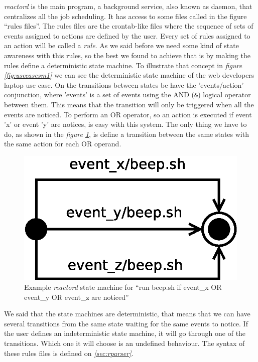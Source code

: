 \emph{reactord} is the main program, a background service, also known as daemon, that centralizes all the job scheduling. It has access
to some files called in the figure ``rules files''. The rules files are the crontab-like files where the sequence of sets of events 
assigned to actions are defined by the user. Every set of rules assigned to an action will be called a \emph{rule}. As we said before we
need some kind of state awareness with this rules, so the best we found to achieve that is by making the rules define a deterministic 
state machine. To illustrate that concept in \emph{figure \ref{fig:usecasesm1}} we can see the deterministic state machine of the web 
developers laptop use case. On the transitions between states be have the 'events/action' conjunction, where 'events' is a set of events
using the AND (\texttt{\&}) logical operator between them. This means that the transition will only be triggered when all the events are
noticed. To perform an OR operator, so an action is executed if event 'x' or event 'y' are notices, is easy with this system. The only
thing we have to do, as shown in the \emph{figure \ref{fig:exsm1}}, is define a transition between the same states with the same action 
for each OR operand. 
\begin{figure}
  \vspace{-20pt}
  \begin{center}
    \includegraphics[scale=0.5,keepaspectratio]{img/exsm1}
  \end{center}
  \caption{Example \emph{reactord} state machine for ``run beep.sh if event\_x OR event\_y OR event\_z are noticed''}
  \label{fig:exsm1}
\end{figure}
We said that the state machines are deterministic, that means that we can have several transitions from the same state
waiting for the same events to notice. If the user defines an indeterministic state machine, it will go through one of the transitions. 
Which one it will choose is an undefined behaviour. The syntax of these rules files is defined on \emph{\ref{sec:rparser}}.\\

